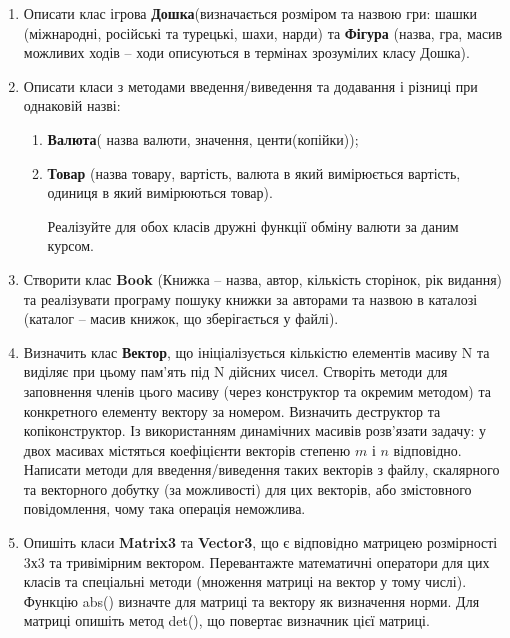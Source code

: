 \documentclass[a5paper,titlepage,openany,twoside,draft]{book_unv}%
\makeatletter
\newcommand{\xslalph}[1]{\expandafter\@xslalph\csname c@#1\endcsname}
\newcommand{\@xslalph}[1]{%
    \ifcase#1\or а\or б\or в\or г\or д\or e\or є\or ж\or з\or i%
    \or й\or к\or л\or м\or н\or о\or п\or р\or с\or т%
    \or у\or ф\or х\or ц\or ч\or ш\or ю\or я\or аа\or бб\or вв%
    \else\@ctrerr\fi%
}
\makeatother
\begin{document}
\begin{enumerate}
\item
  Описати клас ігрова \textbf{Дошка}(визначається розміром та назвою
  гри: шашки (міжнародні, російські та турецькі, шахи, нарди) та
  \textbf{Фігура} (назва, гра, масив можливих ходів -- ходи описуються в
  термінах зрозумілих класу Дошка).

\item
  Описати класи з методами введення/виведення та  додавання і різниці при 
однаковій назві:
\begin{enumerate}[label=\xslalph*)]
\item \textbf{Валюта}( назва валюти, значення, центи(копійки));
\item \textbf{Товар} (назва товару, вартість, валюта в який вимірюється
вартість, одиниця в який вимірюються товар).

Реалізуйте для обох класів дружні функції обміну валюти за даним курсом.
\end{enumerate}

\item
  Створити клас \textbf{Book} (Книжка -- назва, автор, кількість сторінок, рік
  видання) та реалізувати програму пошуку книжки за авторами та назвою в
  каталозі (каталог -- масив книжок, що зберігається у файлі).
  
\item
  Визначить клас \textbf{Вектор}, що ініціалізується кількістю елементів масиву N
  та виділяє при цьому пам'ять під N дійсних чисел. Створіть методи для
  заповнення членів цього масиву (через конструктор та окремим методом)
  та конкретного елементу вектору за номером. Визначить деструктор та
  копіконструктор. Із використанням динамічних масивів розв'язати
  задачу: у двох масивах містяться коефіцієнти векторів степеню $m$ і $n$
  відповідно. Написати методи для введення/виведення таких векторів з файлу,
  скалярного та векторного добутку (за можливості) для цих векторів, або
 змістовного повідомлення, чому така операція неможлива.
 
\item
  Опишіть класи \textbf{Matrix3} та \textbf{Vector3}, що є відповідно матрицею розмірності
  3х3 та тривімірним вектором. Перевантажте математичні оператори для
  цих класів та спеціальні методи (множення матриці на вектор у тому
  числі). Функцію abs() визначте для матриці та вектору як визначення
  норми. Для матриці опишіть метод det(), що повертає визначник цієї
  матриці.


\end{enumerate}
\end{document}
